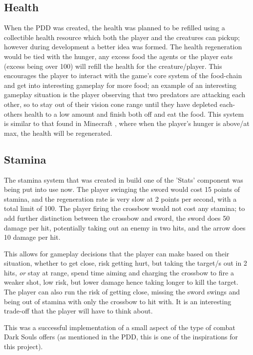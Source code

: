 \documentclass[11pt]{report}
\begin{document}
\subsection{Health}
When the PDD was created, the health was planned to be refilled using a collectible health resource which both the player and the creatures can pickup; however during development a better idea was formed. The health regeneration would be tied with the hunger, any excess food the agents or the player eats (excess being over 100) will refill the health for the creature/player. This encourages the player to interact with the game's core system of the food-chain and get into interesting gameplay for more food; an example of an interesting gameplay situation is the player observing that two predators are attacking each other, so to stay out of their vision cone range until they have depleted each-others health to a low amount and finish both 
off and eat the food.
This system is similar to that found in Minecraft \cite{minecraft}, where when the player's hunger is above/at max, the health will be regenerated.

\subsection{Stamina}
The stamina system that was created in build one of the 'Stats' component was being put into use now. The player swinging the sword would cost 15 points of stamina, and the regeneration rate is very slow at 2 points per second, with a total limit of 100. The player firing the crossbow would not cost any stamina; to add further distinction between the crossbow and sword, the sword does 50 damage per hit, potentially taking out an enemy in two hits, and the arrow does 10 damage per hit.

This allows for gameplay decisions that the player can make based on their situation, whether to get close, risk getting hurt, but taking the target/s out in 2 hits, \textit{or} stay at range, spend time aiming and charging the crossbow to fire a weaker shot, low risk, but lower damage hence taking longer to kill the target. The player can also run the risk of getting close, missing the sword swings and being out of stamina with only the crossbow to hit with. It is an interesting trade-off that the player will have to think about.

This was a successful implementation of a small aspect of the type of combat Dark Souls offers (as mentioned in the PDD, this is one of the inspirations for this project).
\end{document}
